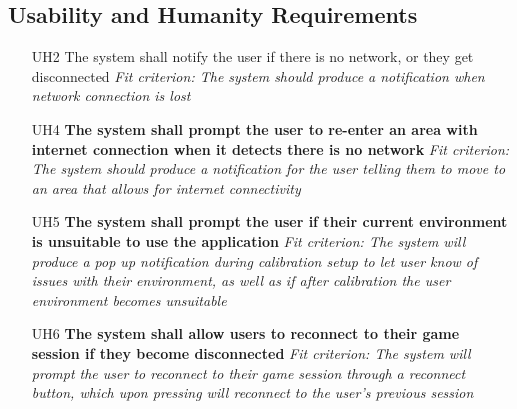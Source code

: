 \documentclass{article}
\begin{document}
\subsection{Usability and Humanity Requirements}
\begin{enumerate}
    \item[UH2] The system shall notify the user if there is no network, or they get disconnected\newline
    \textit{Fit criterion: The system should produce a notification when network connection is lost}
    \item[UH4] \textbf{The system shall prompt the user to re-enter an area with internet connection when it detects there is no network}\newline
    \textit{Fit criterion: The system should produce a notification for the user telling them to move to an area that allows for internet connectivity}
    \item[UH5] \textbf{The system shall prompt the user if their current environment is unsuitable to use the application}\newline
    \textit{Fit criterion: The system will produce a pop up notification during calibration setup to let user know of issues with their environment, as well as if after calibration the user environment becomes unsuitable}
    \item[UH6] \textbf{The system shall allow users to reconnect to their game session if they become disconnected}\newline
    \textit{Fit criterion: The system will prompt the user to reconnect to their game session through a reconnect button, which upon pressing will reconnect to the user's previous session}
\end{enumerate}

\end{document}
